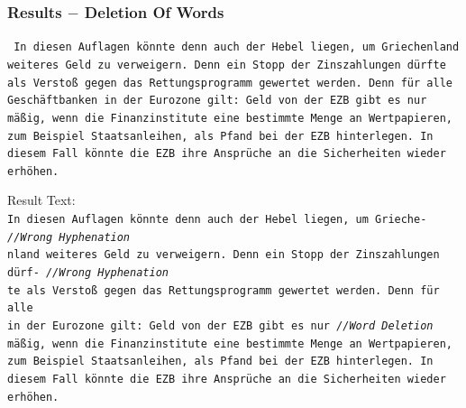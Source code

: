 \documentclass{beamer}
\begin{document}
\begin{frame}
\frametitle{Results $-$ Deletion Of Words}
\texttt{\tiny
In diesen Auflagen könnte denn auch der Hebel liegen, um Griechenland \\
weiteres Geld zu verweigern. Denn ein Stopp der Zinszahlungen dürfte \\
als Verstoß gegen das Rettungsprogramm gewertet werden. Denn für alle \\
Geschäftbanken in der Eurozone gilt: Geld von der EZB gibt es nur \\
mäßig, wenn die Finanzinstitute eine bestimmte Menge an Wertpapieren, \\
zum Beispiel Staatsanleihen, als Pfand bei der EZB hinterlegen. In \\
diesem Fall könnte die EZB ihre Ansprüche an die Sicherheiten wieder \\
erhöhen. \\
}

Result Text: \\

\texttt{\scriptsize{I}\tiny n diesen Auflagen könnte denn auch der Hebel liegen, um Grieche-  \hskip 30pt \emph{//Wrong Hyphenation} \\
\scriptsize{n}\tiny land weiteres Geld zu verweigern. Denn ein Stopp der Zinszahlungen dürf- \emph{//Wrong Hyphenation} \\
\scriptsize{t}\tiny e als Verstoß gegen das Rettungsprogramm gewertet werden. Denn für alle \\
\scriptsize{i}\tiny n der Eurozone gilt: Geld von der EZB gibt es nur \hskip 72pt \emph{//Word Deletion} \\
\scriptsize{m}\tiny äßig, wenn die Finanzinstitute eine bestimmte Menge an Wertpapieren, \\
zum Beispiel Staatsanleihen, als Pfand bei der EZB hinterlegen. In \\
diesem Fall könnte die EZB ihre Ansprüche an die Sicherheiten wieder \\
erhöhen. \\
}
\end{frame}
\end{document}
